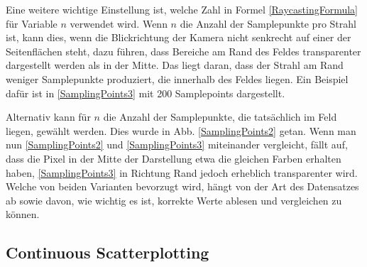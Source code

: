 \documentclass[a4paper,fontsize=12pt,toc=bib,halfparskip]{scrartcl}
\begin{document}
Eine weitere wichtige Einstellung ist, welche Zahl in Formel \ref{RaycastingFormula} f\"ur Variable $n$ verwendet wird. Wenn $n$ die Anzahl der Samplepunkte pro Strahl ist, kann dies, wenn die Blickrichtung der Kamera nicht senkrecht auf einer der Seitenfl\"achen steht, dazu f\"uhren, dass Bereiche am Rand des Feldes transparenter dargestellt werden als in der Mitte. Das liegt daran, dass der Strahl am Rand weniger Samplepunkte produziert, die innerhalb des Feldes liegen. Ein Beispiel daf\"ur ist in \ref{SamplingPoints3} mit 200 Samplepoints dargestellt. 

Alternativ kann f\"ur $n$ die Anzahl der Samplepunkte, die tats\"achlich im Feld liegen, gew\"ahlt werden. Dies wurde in Abb. \ref{SamplingPoints2} getan. Wenn man nun \ref{SamplingPoints2} und \ref{SamplingPoints3} miteinander vergleicht, f\"allt auf, dass die Pixel in der Mitte der Darstellung etwa die gleichen Farben erhalten haben, \ref{SamplingPoints3} in Richtung Rand jedoch erheblich transparenter wird. Welche von beiden Varianten bevorzugt wird, h\"angt von der Art des Datensatzes ab sowie davon, wie wichtig es ist, korrekte Werte ablesen und vergleichen zu k\"onnen.

\subsection{Continuous Scatterplotting}
\end{document}
